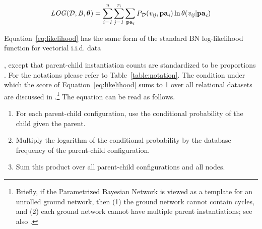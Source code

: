 {{	%
	
	\begin{equation} \label{eq:likelihood}
		\it{LOG}(\mathcal{D},B,\boldsymbol{\theta}) =   \sum_{i=1}^{n}\sum_{j=1}^{r_{i}} \sum_{\mathbf{pa}_{i}}P_{\mathcal{D}}(v_{ij},\mathbf{pa}_{i})\ln \theta(v_{ij}|\mathbf{pa}_{i})  
	\end{equation}
	
	
	Equation~\eqref{eq:likelihood} has the same form of the standard BN log-likelihood function for vectorial i.i.d. data~\cite{Campos2006}}, except that parent-child instantiation counts are standardized to be proportions \cite{Schulte2011}. For the notations please refer to Table~\ref{table:notation}. The condition under which the score of Equation~\eqref{eq:likelihood} sums to 1 over all relational datasets are discussed in \cite{Schulte2011}.\footnote{Briefly, if the Parametrized Bayesian Network is viewed as a template for an unrolled ground network, then (1) the ground network cannot contain cycles, and (2) each ground network cannot have multiple parent instantiations; see also \cite{Heckerman+al:SRL07}.}  The equation can be read as follows.
	
	\begin{enumerate}
		\item For each parent-child configuration, 
		use the conditional probability of the child given the parent.
		\item Multiply the logarithm of the conditional probability by the database frequency of the parent-child configuration. 
		\item Sum this product over all parent-child configurations and all nodes. 
	\end{enumerate}
	
	
}
